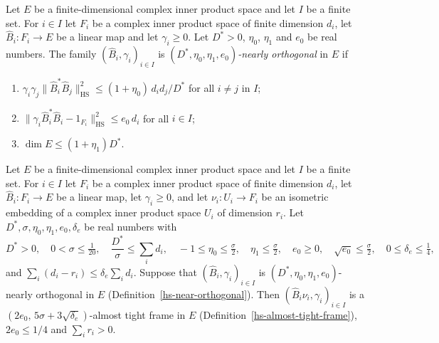 \begin{definition}\label{hs-near-orthogonal}
Let $E$ be a finite-dimensional complex inner product space and let $I$ be a finite set. For
$i\in I$ let $F_i$ be a complex inner product space of finite dimension $d_i$, let
$\hat B_i:F_i\to E$ be a linear map and let $\gamma_i\geq0$. Let $D^*>0$, $\eta_0$, $\eta_1$ and
$e_0$ be real numbers. The family $(\hat B_i,\gamma_i)_{i\in I}$ is
\emph{$(D^*,\eta_0,\eta_1,e_0)$-nearly orthogonal} in $E$ if
\begin{enumerate}
\item $\gamma_i\gamma_j\|\hat B_i^*\hat B_j\|_{\mathrm{HS}}^2\leq(1+\eta_0)\,d_id_j/D^*$ for all
  $i\neq j$ in $I$;
\item $\|\gamma_i\hat B_i^*\hat B_i-1_{F_i}\|_{\mathrm{HS}}^2\leq e_0\,d_i$ for all $i\in I$;
\item $\dim E\leq(1+\eta_1)D^*$.
\end{enumerate}
\end{definition}

\begin{lemma}\label{hs-near-orthogonal-frame}
Let $E$ be a finite-dimensional complex inner product space and let $I$ be a finite set. For
$i\in I$ let $F_i$ be a complex inner product space of finite dimension $d_i$, let
$\hat B_i:F_i\to E$ be a linear map, let $\gamma_i\geq0$, and let $\nu_i:U_i\to F_i$ be an
isometric embedding of a complex inner product space $U_i$ of dimension $r_i$. Let
$D^*,\sigma,\eta_0,\eta_1,e_0,\delta_e$ be real numbers with
\[
 D^*>0,\quad 0<\sigma\leq\tfrac1{20},\quad \frac{D^*}{\sigma}\leq\sum_id_i,\quad
 -1\leq\eta_0\leq\tfrac\sigma2,\quad \eta_1\leq\tfrac\sigma2,\quad e_0\geq0,\quad
 \sqrt{e_0}\leq\tfrac\sigma2,\quad 0\leq\delta_e\leq\tfrac14,
\]
and $\sum_i(d_i-r_i)\leq\delta_e\sum_id_i$. Suppose that $(\hat B_i,\gamma_i)_{i\in I}$ is
$(D^*,\eta_0,\eta_1,e_0)$-nearly orthogonal in $E$ (Definition~\ref{hs-near-orthogonal}). Then
$(\hat B_i\nu_i,\gamma_i)_{i\in I}$ is a $(2e_0,\,5\sigma+3\sqrt{\delta_e})$-almost tight frame in
$E$ (Definition~\ref{hs-almost-tight-frame}), $2e_0\leq1/4$ and $\sum_ir_i>0$.
\end{lemma}

